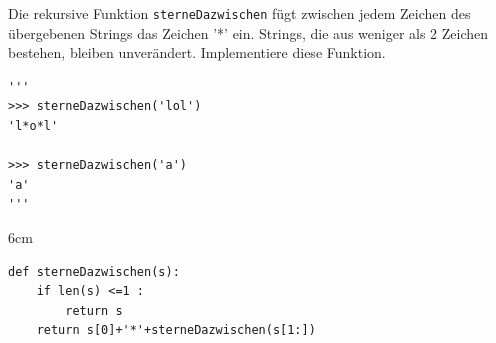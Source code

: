 \question[3]
Die rekursive Funktion \texttt{sterneDazwischen}
fügt zwischen jedem Zeichen des übergebenen Strings das
Zeichen '*' ein. Strings, die aus weniger als 2 Zeichen bestehen,
bleiben unverändert. Implementiere diese Funktion.

\begin{lstlisting}
'''
>>> sterneDazwischen('lol')
'l*o*l'

>>> sterneDazwischen('a')
'a'
'''
\end{lstlisting}

\begin{solutionbox}{6cm}
\begin{lstlisting}
def sterneDazwischen(s):
    if len(s) <=1 :
        return s
    return s[0]+'*'+sterneDazwischen(s[1:])
\end{lstlisting}
\end{solutionbox}
